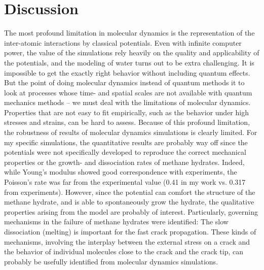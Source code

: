 \section{Discussion}

The most profound limitation in molecular dynamics is the representation of the inter-atomic interactions by classical potentials. Even with infinite computer power, the value of the simulations rely heavily on the quality and applicability of the potentials, and the modeling of water turns out to be extra challenging. It is impossible to get the exactly right behavior without including quantum effects. But the point of doing molecular dynamics instead of quantum methods it to look at processes whose time- and spatial scales are not available with quantum mechanics methods -- we must deal with the limitations of molecular dynamics. Properties that are not easy to fit empirically, such as the behavior under high stresses and strains, can be hard to assess. Because of this profound limitation, the robustness of results of molecular dynamics simulations is clearly limited. For my specific simulations, the quantitative results are probably way off since the potentials were not specifically developed to reproduce the correct mechanical properties or the growth- and dissociation rates of methane hydrates. Indeed, while Young's modulus showed good correspondence with experiments, the Poisson's rate was far from the experimental value (0.41 in my work vs. 0.317 from experiments). However, since the potential can comfort the structure of the methane hydrate, and is able to spontaneously grow the hydrate, the qualitative properties arising from the model are probably of interest. Particularly, governing mechanisms in the failure of methane hydrates were identified: The slow dissociation (melting) is important for the fast crack propagation. These kinds of mechanisms,  involving the interplay between the external stress on a crack and the behavior of individual molecules close to the crack and the crack tip, can probably be usefully identified from molecular dynamics simulations.

